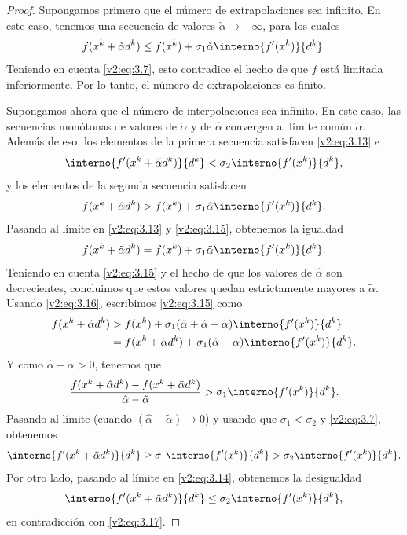 \begin{proof}
    Supongamos primero que el número de extrapolaciones sea infinito. En este caso, tenemos una secuencia de valores $\check{\alpha} \to +\infty$, para los cuales
    \begin{equation}
        f(x^k + \check{\alpha} d^k) \le f(x^k) + \sigma_1 \check{\alpha} \interno{f'(x^k)}{d^k}.
        \label{v2:eq:3.13}
    \end{equation}
    Teniendo en cuenta \eqref{v2:eq:3.7}, esto contradice el hecho de que $f$ está limitada inferiormente. Por lo tanto, el número de extrapolaciones es finito.
    
    Supongamos ahora que el número de interpolaciones sea infinito. En este caso, las secuencias monótonas de valores de $\check{\alpha}$ y de $\hat{\alpha}$ convergen al límite común $\tilde{\alpha}$. Además de eso, los elementos de la primera secuencia satisfacen \eqref{v2:eq:3.13} e
    \begin{equation}
        \interno{f'(x^k + \check{\alpha} d^k)}{d^k} < \sigma_2 \interno{f'(x^k)}{d^k},
        \label{v2:eq:3.14}
    \end{equation}
    y los elementos de la segunda secuencia satisfacen
    \begin{equation}
        f(x^k + \hat{\alpha} d^k) > f(x^k) + \sigma_1 \hat{\alpha} \interno{f'(x^k)}{d^k}.
        \label{v2:eq:3.15}
    \end{equation}
    Pasando al límite en \eqref{v2:eq:3.13} y \eqref{v2:eq:3.15}, obtenemos la igualdad
    \begin{equation}
        f(x^k + \tilde{\alpha} d^k) = f(x^k) + \sigma_1 \tilde{\alpha} \interno{f'(x^k)}{d^k}.
        \label{v2:eq:3.16}
    \end{equation}
    Teniendo en cuenta \eqref{v2:eq:3.15} y el hecho de que los valores de $\hat{\alpha}$ son decrecientes, concluimos que estos valores quedan estrictamente mayores a $\tilde{\alpha}$. Usando \eqref{v2:eq:3.16}, escribimos \eqref{v2:eq:3.15} como
    \begin{align*}
        f(x^k + \hat{\alpha} d^k) &> f(x^k) + \sigma_1 (\tilde{\alpha} + \hat{\alpha} - \tilde{\alpha}) \interno{f'(x^k)}{d^k} \\
        &= f(x^k + \tilde{\alpha} d^k) + \sigma_1 (\hat{\alpha} - \tilde{\alpha}) \interno{f'(x^k)}{d^k}.
    \end{align*}
    Y como $\hat{\alpha} - \tilde{\alpha} > 0$, tenemos que
    \[
        \frac{f(x^k + \hat{\alpha} d^k) - f(x^k + \tilde{\alpha} d^k)}{\hat{\alpha} - \tilde{\alpha}} > \sigma_1 \interno{f'(x^k)}{d^k}.
    \]
    Pasando al límite (cuando $(\hat{\alpha} - \tilde{\alpha}) \to 0$) y usando que $\sigma_1 < \sigma_2$ y \eqref{v2:eq:3.7}, obtenemos
    \begin{equation}
        \interno{f'(x^k + \tilde{\alpha} d^k)}{d^k} \ge \sigma_1 \interno{f'(x^k)}{d^k} > \sigma_2 \interno{f'(x^k)}{d^k}.
        \label{v2:eq:3.17}
    \end{equation}
    Por otro lado, pasando al límite en \eqref{v2:eq:3.14}, obtenemos la desigualdad
    \[
        \interno{f'(x^k + \tilde{\alpha} d^k)}{d^k} \le \sigma_2 \interno{f'(x^k)}{d^k},
    \]
    en contradicción con \eqref{v2:eq:3.17}.
\end{proof}

